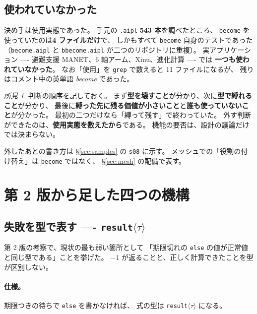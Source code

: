 \documentclass[11pt,a4paper]{ltjsarticle}
\theoremstyle{definition}
\theoremstyle{remark}
\newtheorem{finding}[theorem]{所見}
\begin{document}
\subsection{使われていなかった}

決め手は使用実態であった。
手元の \texttt{.aipl} \textbf{543 本}を調べたところ、
\texttt{become} を使っていたのは\textbf{4 ファイルだけ}で、
しかもすべて \texttt{become} 自身のテストであった
（\texttt{become.aipl} と \texttt{bbecome.aipl} が二つのリポジトリに重複）。
実アプリケーション ---- 避難支援 MANET、6 軸アーム、Xinu、進化計算 ---- では
\textbf{一つも使われていなかった}。
なお「使用」を \texttt{grep} で数えると 11 ファイルになるが、
残りはコメント中の英単語 \emph{become} であった。

\begin{finding}
判断の順序を記しておく。
まず\textbf{型を壊すこと}が分かり、次に\textbf{型で縛れること}が分かり、
最後に\textbf{縛った先に残る価値が小さいこと}と\textbf{誰も使っていないこと}が分かった。
最初の二つだけなら「縛って残す」で終わっていた。
外す判断ができたのは、\textbf{使用実態を数えたから}である。
機能の要否は、設計の議論だけでは決まらない。
\end{finding}

外したあとの書き方は \S\ref{sec:samples} の \texttt{s08} に示す。
メッシュでの「役割の付け替え」は \texttt{become} ではなく、
\S\ref{sec:mesh} の配備で表す。

\section{第 2 版から足した四つの機構}
\label{sec:new}

\subsection{失敗を型で表す ---- \texttt{result}$\langle\tau\rangle$}
\label{sec:result}

第 2 版の考察で、現状の最も弱い箇所として
「期限切れの \texttt{else} の値が正常値と同じ型である」ことを挙げた。
$-1$ が返ることと、正しく計算できたことを型が区別しない。

\paragraph{仕様。}
期限つきの待ちで \texttt{else} を書かなければ、
式の型は \texttt{result}$\langle\tau\rangle$ になる。
\end{document}
